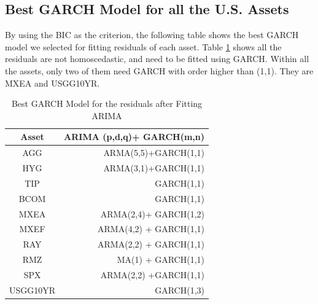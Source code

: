 \documentclass[12pt]{article}
\begin{document}
\subsection{Best GARCH Model for all the U.S. Assets}
By using the BIC as the criterion, the following table shows the best GARCH model we selected for fitting residuals of each asset. Table \ref{table:BestGarch} shows all the residuals are not homoscedastic, and need to be fitted using GARCH. Within all the assets, only two of them need GARCH with order higher than (1,1). They are MXEA and USGG10YR.
\begin{table}[!h]
\caption{Best GARCH Model for the residuals after Fitting ARIMA}
\centering 
\begin{tabular}{ | c || r | } 
 \hline
Asset & ARIMA (p,d,q)+ GARCH(m,n) \\
  \hline \hline
AGG & ARMA(5,5)+GARCH(1,1) \\ 
HYG & ARMA(3,1)+GARCH(1,1) \\ 
TIP &  GARCH(1,1)\\ 
BCOM & GARCH(1,1)\\ 
MXEA & ARMA(2,4)+ GARCH(1,2) \\ 
MXEF & ARMA(4,2) + GARCH(1,1)\\ 
RAY &  ARMA(2,2) + GARCH(1,1)\\ 
RMZ & MA(1) + GARCH(1,1) \\ 
SPX & ARMA(2,2) +GARCH(1,1)\\ 
USGG10YR & GARCH(1,3) \\
 \hline
\end{tabular}
\label{table:BestGarch}
\end{table}

\end{document}
